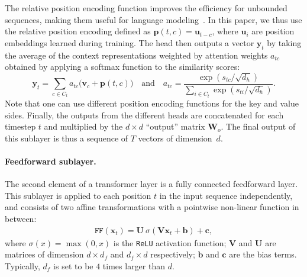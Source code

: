 \documentclass{article}
\begin{document}
The relative position encoding function improves the efficiency for unbounded sequences, making them useful for language modeling~\cite{dai2019transformer}.
In this paper, we thus use the relative position encoding defined as $\mathbf{p}(t, c) = \mathbf{u}_{t-c}$, where $\mathbf{u}_i$ are position embeddings learned during training.
The head then outputs a vector $\mathbf{y}_t$ by taking the average of the context representations weighted by attention weights $a_{tc}$ obtained by applying a softmax function to the similarity scores:
\begin{equation}\label{eq:att}
  \mathbf{y}_t = \sum_{c \in C_t} a_{tc} \big( \mathbf{v}_c + \mathbf{p}(t, c) \big) \textrm{~~~and~~~} a_{tc}=\frac{\exp\left( s_{tc} / \sqrt{d_h} \right)}{\sum\limits_{i \in C_t}\exp\left( s_{ti} / \sqrt{d_h} \right)}.
\end{equation}
Note that one can use different position encoding functions for the key and value sides.
Finally, the outputs from the different heads are concatenated for each timestep $t$ and multiplied by the $d\times d$ ``output'' matrix $\mathbf{W}_o$.
The final output of this sublayer is thus a sequence of $T$ vectors of dimension~$d$.

\paragraph{Feedforward sublayer.}
The second element of a transformer layer is a fully connected feedforward layer.
This sublayer is applied to each position $t$ in the input sequence independently, and consists of two affine transformations with a pointwise non-linear function in between:
\begin{eqnarray}\label{eq:ff}
  \texttt{FF}(\mathbf{x}_t) = \mathbf{U}~\sigma\left(\mathbf{V} \mathbf{x}_t + \mathbf{b} \right) + \mathbf{c},
\end{eqnarray}
where $\sigma(x)=\max(0,x)$ is the \texttt{ReLU} activation function; $\mathbf{V}$ and $\mathbf{U}$ are matrices of dimension $d \times d_f$ and $d_f \times d$ respectively; $\mathbf{b}$ and $\mathbf{c}$ are the bias terms.
Typically, $d_f$ is set to be $4$ times larger than $d$.
\end{document}
